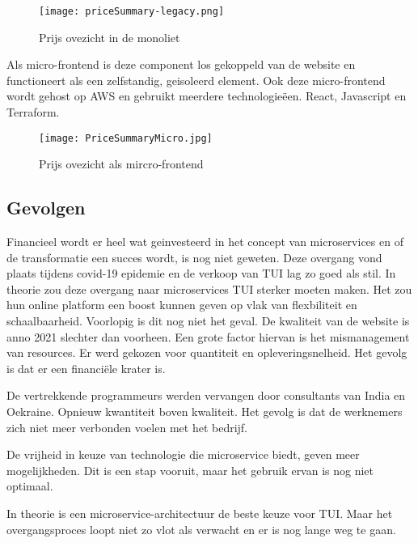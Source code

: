 \begin{figure}[!htb]
    \centering
    \texttt{[image: priceSummary-legacy.png]}
    \caption{Prijs ovezicht in de monoliet \label{pricelegacy}}
\end{figure}

Als micro-frontend is deze component los gekoppeld van de website en functioneert als een zelfstandig, geisoleerd element. Ook deze micro-frontend wordt gehost op AWS en gebruikt meerdere technologieëen. React, Javascript en Terraform.

\begin{figure}[!htb]
    \centering
    \texttt{[image: PriceSummaryMicro.jpg]}
    \caption{Prijs ovezicht als mircro-frontend \label{pricemicro}}
\end{figure}

\subsection{Gevolgen}

Financieel wordt er heel wat geinvesteerd in het concept van microservices en of de transformatie een succes wordt, is nog niet geweten. Deze overgang vond plaats tijdens covid-19 epidemie en de verkoop van TUI lag zo goed als stil. In theorie zou deze overgang naar microservices TUI sterker moeten maken. Het zou hun online platform een boost kunnen geven op vlak van flexbiliteit en schaalbaarheid. Voorlopig is dit nog niet het geval. De kwaliteit van de website is anno 2021 slechter dan voorheen. Een grote factor hiervan is het mismanagement van resources. Er werd gekozen voor quantiteit en opleveringsnelheid. Het gevolg is dat er een financiële krater is.

De vertrekkende programmeurs werden vervangen door consultants van India en Oekraine. Opnieuw kwantiteit boven kwaliteit. Het gevolg is dat de werknemers zich niet meer verbonden voelen met het bedrijf.

De vrijheid in keuze van technologie die microservice biedt, geven meer mogelijkheden. Dit is een stap vooruit, maar het gebruik ervan is nog niet optimaal. 

In theorie is een microservice-architectuur de beste keuze voor TUI. Maar het overgangsproces loopt niet zo vlot als verwacht en er is nog lange weg te gaan.
